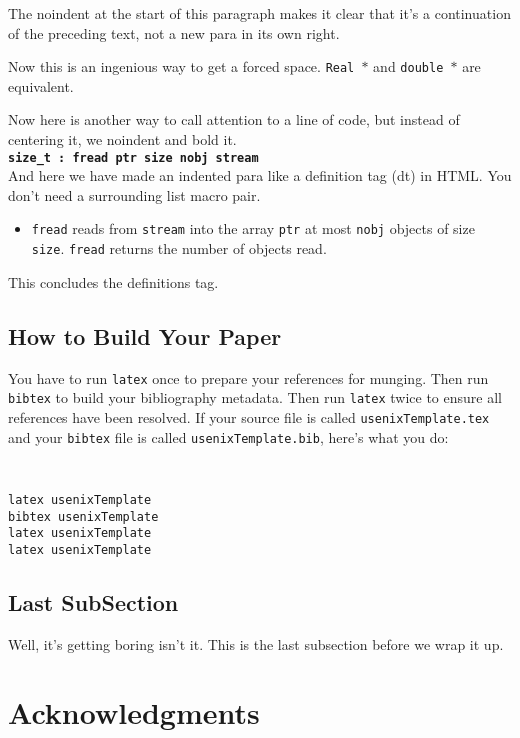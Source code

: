 \documentclass[letterpaper,twocolumn,10pt]{article}
\begin{document}
\noindent
The noindent at the start of this paragraph makes it clear that it's a continuation of the preceding text, not a new
para in its own right.


Now this is an ingenious way to get a forced space. {\tt Real~$*$} and {\tt double~$*$} are equivalent. 

Now here is another way to call attention to a line of code, but instead of centering it, we noindent and bold it.\\

\noindent
{\bf \tt size\_t : fread ptr size nobj stream } \\

And here we have made an indented para like a definition tag (dt) in HTML. You don't need a surrounding list macro pair.
\begin{itemize}
\item[]  {\tt fread} reads from {\tt stream} into the array {\tt ptr} at most {\tt nobj} objects of size {\tt size}. 
{\tt fread} returns the number of objects read. 
\end{itemize}
This concludes the definitions tag.

\subsection{How to Build Your Paper}

You have to run {\tt latex} once to prepare your references for munging. Then run {\tt bibtex} to build your
bibliography metadata. Then run {\tt latex} twice to ensure all references have been resolved. If your source file is
called {\tt usenixTemplate.tex} and your {\tt bibtex} file is called {\tt usenixTemplate.bib}, here's what you do:
{\tt \small
\begin{verbatim}
latex usenixTemplate
bibtex usenixTemplate
latex usenixTemplate
latex usenixTemplate
\end{verbatim}
}


\subsection{Last SubSection}

Well, it's getting boring isn't it. This is the last subsection before we wrap it up.

\section{Acknowledgments}
\end{document}

